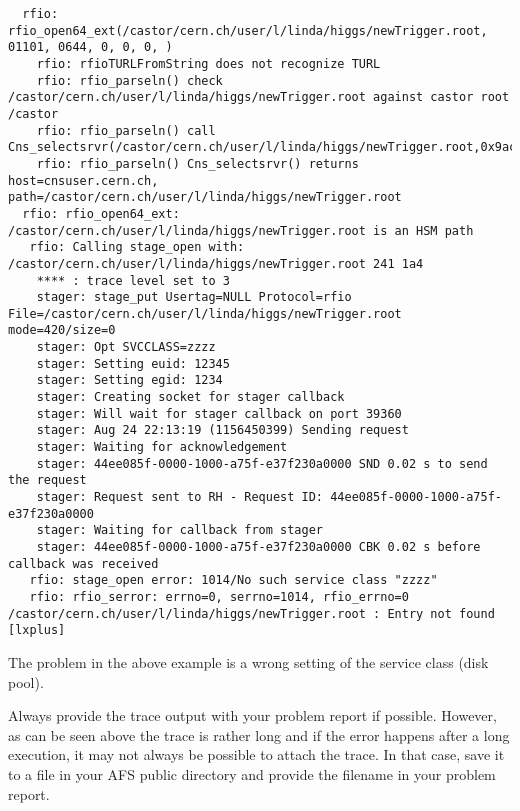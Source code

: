 \begin{verbatim}
  rfio: rfio_open64_ext(/castor/cern.ch/user/l/linda/higgs/newTrigger.root, 01101, 0644, 0, 0, 0, )
    rfio: rfioTURLFromString does not recognize TURL
    rfio: rfio_parseln() check /castor/cern.ch/user/l/linda/higgs/newTrigger.root against castor root /castor
    rfio: rfio_parseln() call Cns_selectsrvr(/castor/cern.ch/user/l/linda/higgs/newTrigger.root,0x9ac4618,0x9ac4200,0xbfff5160)
    rfio: rfio_parseln() Cns_selectsrvr() returns host=cnsuser.cern.ch, path=/castor/cern.ch/user/l/linda/higgs/newTrigger.root
  rfio: rfio_open64_ext: /castor/cern.ch/user/l/linda/higgs/newTrigger.root is an HSM path
   rfio: Calling stage_open with: /castor/cern.ch/user/l/linda/higgs/newTrigger.root 241 1a4
    **** : trace level set to 3
    stager: stage_put Usertag=NULL Protocol=rfio File=/castor/cern.ch/user/l/linda/higgs/newTrigger.root mode=420/size=0
    stager: Opt SVCCLASS=zzzz
    stager: Setting euid: 12345
    stager: Setting egid: 1234 
    stager: Creating socket for stager callback
    stager: Will wait for stager callback on port 39360
    stager: Aug 24 22:13:19 (1156450399) Sending request
    stager: Waiting for acknowledgement
    stager: 44ee085f-0000-1000-a75f-e37f230a0000 SND 0.02 s to send the request
    stager: Request sent to RH - Request ID: 44ee085f-0000-1000-a75f-e37f230a0000
    stager: Waiting for callback from stager
    stager: 44ee085f-0000-1000-a75f-e37f230a0000 CBK 0.02 s before callback was received
   rfio: stage_open error: 1014/No such service class "zzzz"
   rfio: rfio_serror: errno=0, serrno=1014, rfio_errno=0
/castor/cern.ch/user/l/linda/higgs/newTrigger.root : Entry not found
[lxplus]
\end{verbatim} 
\normalsize

The problem in the above example is a wrong setting of the service class (disk pool).

Always provide the trace output with your problem report if possible. However, as can be seen
above the trace is rather long and if the error happens after a long execution, it may not always
be possible to attach the trace. In that case, save it to a file in your AFS public directory
and provide the filename in your problem report.

